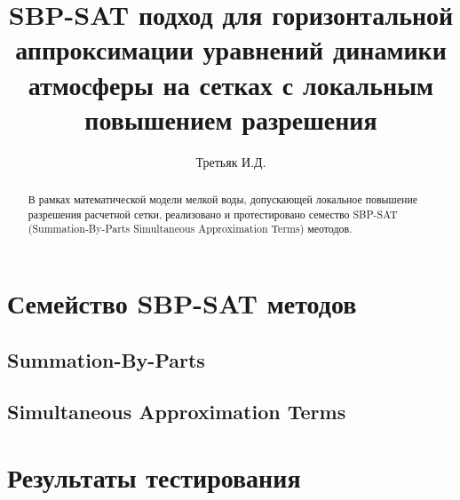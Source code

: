 \documentclass[12pt,a4paper]{article} %
\author{Третьяк И.Д.}
\title{SBP-SAT подход для горизонтальной аппроксимации уравнений динамики атмосферы на сетках с локальным повышением разрешения}
\begin{document}
\maketitle

\begin{abstract}
В рамках математической модели мелкой воды, допускающей локальное повышение разрешения расчетной сетки, реализовано и протестировано семество SBP-SAT (Summation-By-Parts Simultaneous Approximation Terms) меотодов.
\end{abstract}

\section{Семейство SBP-SAT методов}
\subsection{Summation-By-Parts}
\subsection{Simultaneous Approximation Terms}
	
\section{Результаты тестирования}
\end{document}

